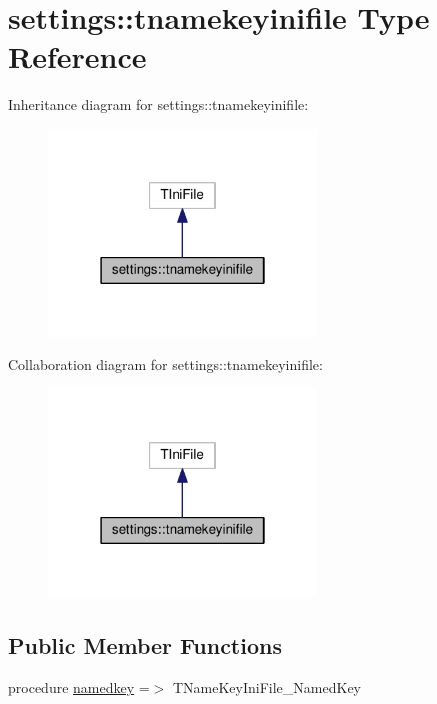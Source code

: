 \hypertarget{structsettings_1_1tnamekeyinifile}{}\section{settings\+:\+:tnamekeyinifile Type Reference}
\label{structsettings_1_1tnamekeyinifile}


Inheritance diagram for settings\+:\+:tnamekeyinifile\+:
\nopagebreak
\begin{figure}[H]
\begin{center}
\leavevmode
\includegraphics[width=202pt]{structsettings_1_1tnamekeyinifile__inherit__graph}
\end{center}
\end{figure}


Collaboration diagram for settings\+:\+:tnamekeyinifile\+:
\nopagebreak
\begin{figure}[H]
\begin{center}
\leavevmode
\includegraphics[width=202pt]{structsettings_1_1tnamekeyinifile__coll__graph}
\end{center}
\end{figure}
\subsection*{Public Member Functions}
\begin{DoxyCompactItemize}
\item 
procedure \mbox{\hyperlink{structsettings_1_1tnamekeyinifile_aa3c5b9d378e0890fe70b2950df3fc656}{namedkey}} =$>$ T\+Name\+Key\+Ini\+File\+\_\+\+Named\+Key
\end{DoxyCompactItemize}


